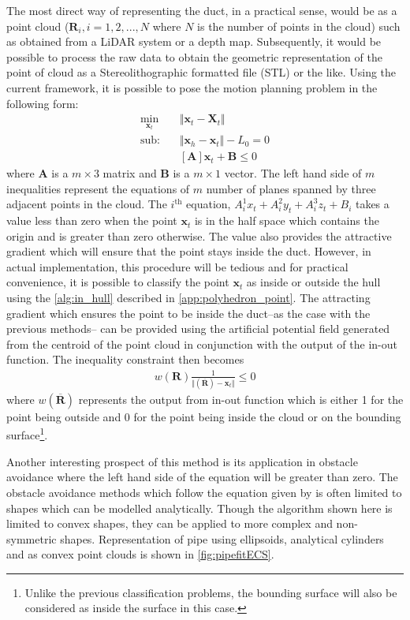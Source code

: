 \documentclass[12pt,a4]{article}
\begin{document}
The most direct way of representing the duct, in a practical sense, would be as a point cloud  ($\mathbf{R}_i,i=1,2,...,N$ where $N$ is the number of points in the cloud) such as obtained from a LiDAR system or a depth map. Subsequently, it would be possible to process the raw data to obtain the geometric representation of the point of cloud as a Stereolithographic formatted file (STL) or the like. Using the current framework, it is possible to pose the motion planning problem in the following form:
\begin{align}
\label{eq:STLeqs}
\min_{\textbf{x}_t} &\Vert \textbf{x}_t-\textbf{X}_t \Vert\\
\nonumber \text{sub:~~~} &\Vert \textbf{x}_h - \textbf{x}_t \Vert -L_0 = 0\\
&[\mathbf{A}]\mathbf{x}_t+\mathbf{B}\leq 0 \nonumber
\end{align}
where $\mathbf{A}$ is a $m\times 3$ matrix and $\mathbf{B}$ is a $m\times 1$ vector. The left hand side of $m$ inequalities represent the equations of $m$ number of planes spanned by three adjacent points in the cloud. The $i^\text{th}$ equation, $A_{i}^1x_t+A_{i}^2y_t+A_{i}^3z_t+B_i$ takes a value less than zero when the point $\mathbf{x}_t$ is in the half space which contains the origin and is greater than zero otherwise. The value also provides the attractive gradient which will ensure that the point stays inside the duct. However, in actual implementation, this procedure will be tedious and for practical convenience, it is possible to classify the point $\mathbf{x}_t$ as inside or outside the hull using the \cref{alg:in_hull} described in \cref{app:polyhedron_point}. The attracting gradient which ensures the point to be inside the duct--as the case with the previous methods-- can be provided using the artificial potential field generated from the centroid of the point cloud in conjunction with the output of the in-out function. The inequality constraint then becomes
\begin{align}
\label{eq:STLineq}
w(\mathbf{R})\frac{1}{\Vert(\overline{\mathbf{R}})-\mathbf{x}_t\Vert}\leq 0
\end{align}
where $w(\overline{\mathbf{R}})$ represents the output from in-out function which is either 1 for the point being outside and 0 for the point being inside the cloud or on the bounding surface\footnote{Unlike the previous classification problems, the bounding surface will also be considered as inside the surface in this case.}. 

Another interesting prospect of this method is its application in obstacle avoidance where the left hand side of the equation  will be greater than zero. The obstacle avoidance methods which follow the equation given by  is often limited to shapes which can be modelled analytically. Though the algorithm shown here is limited to convex shapes, they can be applied to more complex and non-symmetric shapes. Representation of pipe using ellipsoids, analytical cylinders and as convex point clouds is shown in \ref{fig:pipefitECS}.
\end{document}

